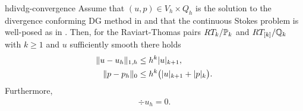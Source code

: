 \begin{Theorem}{hdivdg-convergence}
  Assume that $(u,p)\in V_h\times Q_h$ is the solution to the
  divergence conforming DG method in  and
  that the continuous Stokes problem is well-posed as in
  . Then, for the Raviart-Thomas
  pairs $RT_k/\P_k$ and $RT_{[k]}/\Q_k$ with $k\ge 1$ and
  $u$ sufficiently smooth there holds
  \begin{align}
    \label{eq:hdivdg:5}
    \norm{u-u_h}_{1,h} &\le h^k \snorm{u}_{k+1}, \\
    \label{eq:hdivdg:7}
    \norm{p-p_h}_{0} &\le h^k \bigl(\snorm{u}_{k+1} + \snorm{p}_{k}\bigr).
  \end{align}
  Furthermore,
  \begin{gather}
    \label{eq:hdivdg:6}
    \div u_h = 0.
  \end{gather}
\end{Theorem}

